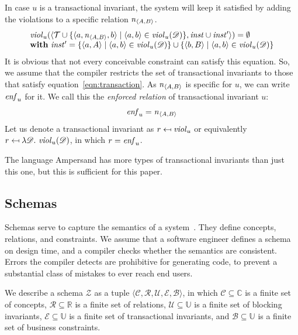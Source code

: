 \documentclass[runningheads]{llncs}
\newcommand{\id}[1]{\text{\it #1\/}}
\newcommand{\instance}{\mathbin{\id{inst}}}
\newcommand{\viol}[2]{\violC{#1}(#2)}
\newcommand{\violC}[1]{\id{viol}_{#1}}
\newcommand{\enfRel}[1]{\id{enf}_{#1}}
\newcommand{\declare}[3]{\id{#1}_{\pair{#2}{#3}}}
\newcommand{\pair}[2]{\langle{#1},{#2}\rangle}
\newcommand{\triple}[3]{\langle{#1},{#2},{#3}\rangle}
\newcommand{\quintuple}[5]{\langle{#1},{#2},{#3},{#4},{#5}\rangle}
\newcommand{\concepts}{\mathcal{C}}
\newcommand{\Concepts}{\mathbb{C}}
\newcommand{\rels}{\mathcal{R}}   %
\newcommand{\Rels}{\mathbb{R}}   %
\newcommand{\triples}{\mathcal{T}}
\newcommand{\rules}{\mathcal{U}}
\newcommand{\transactions}{\mathcal{E}}
\newcommand{\busConstraints}{\mathcal{B}}
\newcommand{\Constraints}{\mathbb{U}}
\newcommand{\dataset}{\mathscr{D}}
\newcommand{\schema}{\mathscr{Z}}
\def\define#1{\label{dfn:#1}{\em #1}\index{#1}}
\begin{document}
   In case $u$ is a transactional invariant,
   the system will keep it satisfied by adding the violations to a specific relation $\declare{n}{A}{B}$.
\begin{equation}
   \begin{array}[t]{l}
      \viol{u}{\pair{\triples\cup\{\triple{a}{\declare{n}{A}{B}}{b}\mid\pair{a}{b}\in\viol{u}{\dataset}\}}{\instance\cup\instance'}}=\emptyset\\
      \text{\bf with}\ \instance'=\{ \pair{a}{A}\mid\pair{a}{b}\in\viol{u}{\dataset}\}\cup\{ \pair{b}{B}\mid\pair{a}{b}\in\viol{u}{\dataset}\}
   \end{array}
\label{eqn:transaction}
\end{equation}
   It is obvious that not every conceivable constraint can satisfy this equation.
   So, we assume that the compiler restricts the set of transactional invariants to those that satisfy equation~\ref{eqn:transaction}.
   As $\declare{n}{A}{B}$ is specific for $u$, we can write $\enfRel{u}$ for it.
   We call this the \define{enforced relation} of transactional invariant $u$:
\begin{equation}
   \enfRel{u}=\declare{n}{A}{B}
\end{equation}
   Let us denote a transactional invariant as $r\mapsfrom\violC{u}$ or equivalently $r \mapsfrom \lambda \dataset.~\viol{u}{\dataset}$,
   in which $r=\enfRel{u}$.
   
   The language Ampersand has more types of transactional invariants than just this one,
   but this is sufficient for this paper.

\subsection{Schemas}
\label{sct:Schemas}
   Schemas serve to capture the semantics of a system~\cite{Spivak2012}.
   They define concepts, relations, and constraints.
   We assume that a software engineer defines a schema on design time, and a compiler checks whether the semantics are consistent.
   Errors the compiler detects are prohibitive for generating code,
   to prevent a substantial class of mistakes to ever reach end users.

   We describe a schema $\schema$ as a tuple $\quintuple{\concepts}{\rels}{\rules}{\transactions}{\busConstraints}$,
   in which $\concepts\subseteq\Concepts$ is a finite set of concepts,
   $\rels\subseteq\Rels$ is a finite set of relations,
   $\rules\subseteq\Constraints$ is a finite set of blocking invariants,
   $\transactions\subseteq\Constraints$ is a finite set of transactional invariants,
   and $\busConstraints\subseteq\Constraints$ is a finite set of business constraints.
\end{document}
